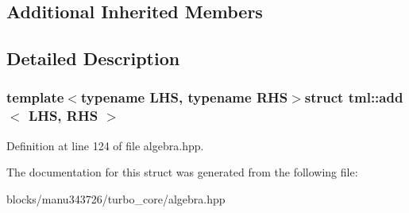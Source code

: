 \subsection*{Additional Inherited Members}


\subsection{Detailed Description}
\subsubsection*{template$<$typename L\+H\+S, typename R\+H\+S$>$struct tml\+::add$<$ L\+H\+S, R\+H\+S $>$}



Definition at line 124 of file algebra.\+hpp.



The documentation for this struct was generated from the following file\+:\begin{DoxyCompactItemize}
\item 
blocks/manu343726/turbo\+\_\+core/algebra.\+hpp\end{DoxyCompactItemize}
